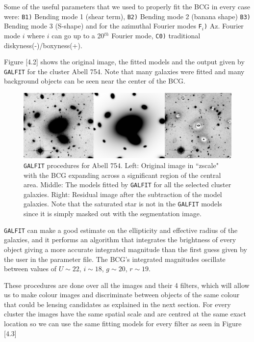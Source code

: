 Some of the useful parameters that we used to properly fit the BCG in every case were: \texttt{B1)} Bending mode 1 (shear term), \texttt{B2)} Bending mode 2 (banana shape)
\texttt{B3)} Bending mode 3 (S-shape) and for the azimuthal Fourier modes
\texttt{F$_i$)} Az. Fourier mode $i$ where $i$ can go up to a 20$^{th}$ Fourier mode, \texttt{C0)}   traditional diskyness(-)/boxyness(+).

Figure [4.2] shows the original image, the fitted models and the output given by \texttt{GALFIT} for the cluster Abell 754. Note that many galaxies were fitted and many background objects can be seen near the center of the BCG. 

\begin{figure}[H]
\centering
\includegraphics[width=15cm]{images/galfit.png}
\caption[\texttt{GALFIT} results for Abell 754]{\texttt{GALFIT} procedures for Abell 754. Left: Original image in ``zscale" with the BCG expanding across a significant region of the central area. Middle: The models fitted by \texttt{GALFIT} for all the selected cluster galaxies. Right: Residual image after the subtraction of the model galaxies. Note that the saturated star is not in the \texttt{GALFIT} models since it is simply masked out with the segmentation image.}
\end{figure}

\texttt{GALFIT} can make a good estimate on the ellipticity and effective radius of the galaxies, and it performs an algorithm that integrates the brightness of every object giving a more accurate integrated magnitude than the first guess given by the user in the parameter file. The BCG's integrated magnitudes oscillate between values of $U\sim 22$, $i\sim 18$, $g\sim 20$, $r\sim 19$.

These procedures are done over all the images and their 4 filters, which will allow us to make colour images and discriminate between objects of the same colour that could be lensing candidates as explained in the next section. For every cluster the images have the same spatial scale and are centred at the same exact location so we can use the same fitting models for every filter as seen in Figure [4.3]

